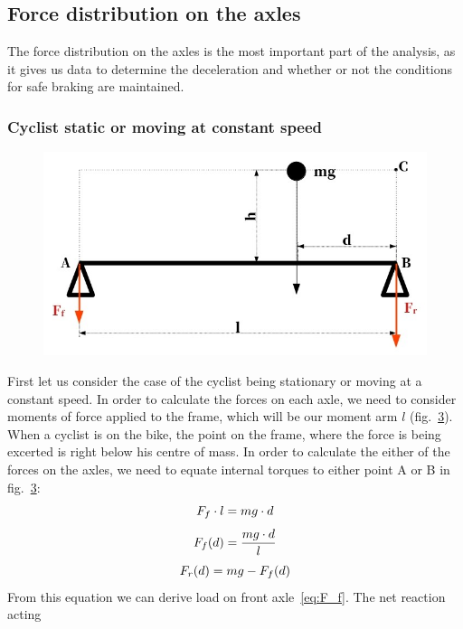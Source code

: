 \documentclass[12pt, a4]{article}
\begin{document}
\begin{figure}[H]
\begin{subfigure}[b]{0.3\linewidth}
\caption{}%
\label{fig:beam_diagram}
\end{subfigure}%
\label{fig:theoretical_models}
\end{figure}
\subsection{Force distribution on the axles}\label{theory_force_distro}
The force distribution on the axles is the most important part of the analysis, as it gives us data to 
determine the deceleration and whether or not the conditions for safe braking are maintained.
\subsubsection{Cyclist static or moving at constant speed}\label{theory_force_distro_static}
\begin{figure}[H]
\centering
\caption{}
\includegraphics[width=0.5\linewidth]{static_forces_simplified}%
\label{fig:static_diagram}
\end{figure}
First let us consider the case of the cyclist being stationary or moving at a constant speed. In order to 
calculate the forces on each axle, we need to consider moments of force applied to the frame, which will be
our moment arm $l$ (fig.~\ref{fig:static_diagram}). When a cyclist is on the bike, the point on the frame, where
the force is being excerted is right below his centre of mass. In order to calculate the either of the forces 
on the axles, we need to equate internal torques to either point A or B in fig.~\ref{fig:static_diagram}: 
\begin{equation}
\centering%
\label{eq:equating_torques}
F_f \cdot l = mg \cdot d
\end{equation}
\begin{equation}
\centering%
\label{eq:F_f}
F_f(d) = \frac{mg \cdot d}{l}
\end{equation}
\begin{equation}
\centering%
\label{eq:F_r}
F_r(d) = mg - F_f(d)
\end{equation}
From this equation we can derive load on front axle~\eqref{eq:F_f}. The net reaction acting 
\end{document}

